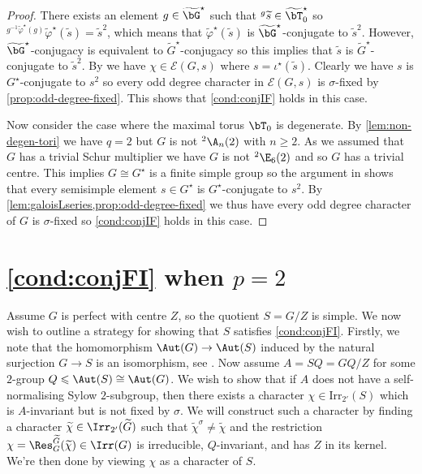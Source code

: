 \documentclass[eqthmnum, nocolour]{jt-calcs}
\newcommand{\irr}{\mathrm{Irr}}
\begin{document}
\begin{proof}
There exists an element $g \in \widetilde{\bG}^{\star}$ such that ${}^g\widetilde{s} \in \widetilde{\bT}_0^{\star}$ so ${}^{g^{-1}\widetilde{\varphi}^{\star}(g)}\widetilde{\varphi}^{\star}(\widetilde{s}) = \widetilde{s}^2$, which means that $\widetilde{\varphi}^{\star}(\widetilde{s})$ is $\widetilde{\bG}^{\star}$-conjugate to $\widetilde{s}^2$. However, $\widetilde{\bG}^{\star}$-conjugacy is equivalent to $\widetilde{G}^{\star}$-conjugacy so this implies that $\widetilde{s}$ is $\widetilde{G}^{\star}$-conjugate to $\widetilde{s}^2$. By \cite[11.7]{bonnafe:2006:sln} we have $\chi \in \mathcal{E}(G,s)$ where $s = \iota^{\star}(\widetilde{s})$. Clearly we have $s$ is $G^{\star}$-conjugate to $s^2$ so every odd degree character in $\mathcal{E}(G,s)$ is $\sigma$-fixed by \cref{prop:odd-degree-fixed}. This shows that \cref{cond:conjIF} holds in this case.

Now consider the case where the maximal torus $\bT_0$ is degenerate. By \cref{lem:non-degen-tori} we have $q = 2$ but $G$ is not ${}^2\A_n(2)$ with $n \geqslant 2$. As we assumed that $G$ has a trivial Schur multiplier we have $G$ is not ${}^2\E_6(2)$ and so $G$ has a trivial centre. This implies $G \cong G^{\star}$ is a finite simple group so the argument in \cite[Lemma 2.4]{guralnick-malle-navarro:2004:self-normalising-sylows} shows that every semisimple element $s \in G^{\star}$ is $G^{\star}$-conjugate to $s^2$. By \cref{lem:galoisLseries,prop:odd-degree-fixed} we thus have every odd degree character of $G$ is $\sigma$-fixed so \cref{cond:conjIF} holds in this case.
\end{proof}

\section{\cref{cond:conjFI} when $p=2$}\label{sec:condition-conjFI}
\begin{pa}
Assume $G$ is perfect with centre $Z$, so the quotient $S = G/Z$ is simple. We now wish to outline a strategy for showing that $S$ satisfies \cref{cond:conjFI}. Firstly, we note that the homomorphism $\Aut(G) \to \Aut(S)$ induced by the natural surjection $G \to S$ is an isomorphism, see \cite[Theorem 2.5.14(d)]{gorenstein-lyons-solomon:1998:classification-3}. Now assume $A = SQ = GQ/Z$ for some $2$-group $Q \leqslant \Aut(S) \cong \Aut(G)$. We wish to show that if $A$ does not have a self-normalising Sylow $2$-subgroup, then there exists a character $\chi\in\irr_{2'}(S)$ which is $A$-invariant but is not fixed by $\sigma$. We will construct such a character by finding a character $\widetilde{\chi} \in \Irr_{2'}(\widetilde{G})$ such that $\widetilde{\chi}^\sigma \neq \widetilde{\chi}$ and the restriction $\chi=\Res_G^{\widetilde{G}}(\widetilde{\chi}) \in \Irr(G)$ is irreducible, $Q$-invariant, and has $Z$ in its kernel. We're then done by viewing $\chi$ as a character of $S$.
\end{pa}
\end{document}
